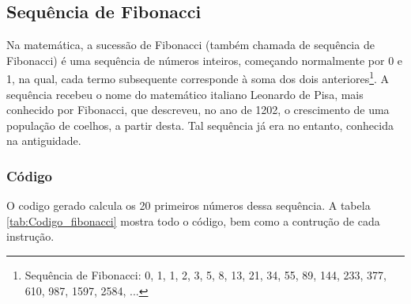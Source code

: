 \documentclass{article}
\newcommand\tab[1][0.50cm]{\hspace*{#1}}
\begin{document}
		\subsection[Sequ\^{e}ncia de Fibonacci]{Sequ\^{e}ncia de Fibonacci}
			\tab Na matem\'{a}tica, a sucess\~{a}o de Fibonacci (tamb\'{e}m chamada de sequ\^{e}ncia de Fibonacci) \'{e} uma sequ\^{e}ncia de n\'{u}meros inteiros, come\c{c}ando normalmente por 0 e 1, na qual, cada termo subsequente corresponde \`{a} soma dos dois anteriores\footnote{Sequ\^{e}ncia de Fibonacci: 0, 1, 1, 2, 3, 5, 8, 13, 21, 34, 55, 89, 144, 233, 377, 610, 987, 1597, 2584, ...}. A sequ\^{e}ncia recebeu o nome do matem\'{a}tico italiano Leonardo de Pisa, mais conhecido por Fibonacci, que descreveu, no ano de 1202, o crescimento de uma popula\c{c}\~{a}o de coelhos, a partir desta. Tal sequ\^{e}ncia j\'{a} era no entanto, conhecida na antiguidade.
			\subsubsection{C\'{o}digo}			
				\tab O codigo gerado calcula os 20 primeiros n\'{u}meros dessa sequ\^{e}ncia. A tabela \ref{tab:Codigo_fibonacci} mostra todo o c\'{o}digo, bem como a contru\c{c}\~{a}o de cada instru\c{c}\~{a}o.		
				
\end{document}
